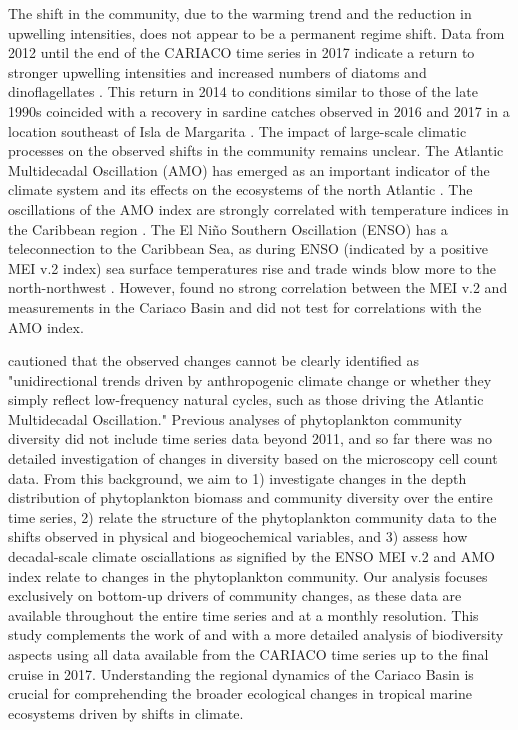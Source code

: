 \documentclass[draft]{agujournal2019}
\begin{document}
    The shift in the community, due to the warming trend and the reduction in upwelling intensities, does not appear to be a permanent regime shift. Data from 2012 until the end of the CARIACO time series in 2017 indicate a return to stronger upwelling intensities and increased numbers of diatoms and dinoflagellates \cite{muller-karger_scientific_2019}. This return in 2014 to conditions similar to those of the late 1990s coincided with a recovery in sardine catches observed in 2016 and 2017 in a location southeast of Isla de Margarita \cite{gomez_gaspar_variacion_2025}. 
    The impact of large-scale climatic processes on the observed shifts in the community remains unclear. The Atlantic Multidecadal Oscillation (AMO) has emerged as an important indicator of the climate system and its effects on the ecosystems of the north Atlantic \cite{nye_ecosystem_2014}. The oscillations of the AMO index are strongly correlated with temperature indices in the Caribbean region \cite{stephenson_changes_2014}.
    The El Niño Southern Oscillation (ENSO) has a teleconnection to the Caribbean Sea, as during ENSO (indicated by a positive MEI v.2 index) sea surface temperatures rise and trade winds blow more to the north-northwest \cite{enfield_tropical_1997}. However,  found no strong correlation between the MEI v.2 and measurements in the Cariaco Basin and did not test for correlations with the AMO index.

     cautioned that the observed changes cannot be clearly identified as "unidirectional trends driven by anthropogenic climate change or whether they simply reflect low-frequency natural cycles, such as those driving the Atlantic Multidecadal Oscillation."
    Previous analyses of phytoplankton community diversity did not include time series data beyond 2011, and so far there was no detailed investigation of changes in diversity based on the microscopy cell count data.
    From this background, we aim to 1) investigate changes in the depth distribution of phytoplankton biomass and community diversity over the entire time series, 2) relate the structure of the phytoplankton community data to the shifts observed in physical and biogeochemical variables, and 3) assess how decadal-scale climate osciallations as signified by the ENSO MEI v.2 and AMO index relate to changes in the phytoplankton community.
    Our analysis focuses exclusively on bottom-up drivers of community changes, as these data are available throughout the entire time series and at a monthly resolution. This study complements the work of  and  with a more detailed analysis of biodiversity aspects using all data available from the CARIACO time series up to the final cruise in 2017. Understanding the regional dynamics of the Cariaco Basin is crucial for comprehending the broader ecological changes in tropical marine ecosystems driven by shifts in climate. 
        
\end{document}
